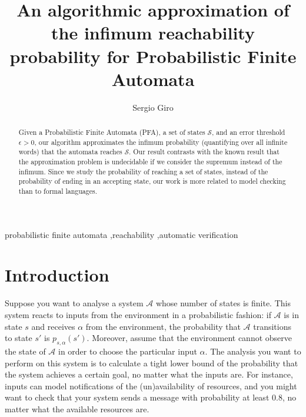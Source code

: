 \documentclass[final,3p,times,twocolumn]{elsarticle}
\theoremstyle{plain}
\theoremstyle{definition}
\newcommand{\reachset}{\mathcal{S}}
\newcommand{\errthres}{\epsilon}
\newcommand{\sys}{\mathcal{A}}
\newcommand{\prob}[3]{p_{{#1},{#2}}(#3)}
\begin{document}
\begin{frontmatter}



\title{An algorithmic approximation of the infimum reachability
			probability for Probabilistic Finite Automata}\author{Sergio Giro}\address{FaMAF -- Universidad Nacional de C\'ordoba -- Argentina\\
			FCEIA -- Universidad Nacional de Rosario}













\begin{abstract}
Given a Probabilistic Finite Automata (PFA), a set of states $\reachset$,
and an error threshold $\errthres > 0$, our algorithm approximates the
infimum probability (quantifying over all infinite words) that the automata
reaches $\reachset$. Our result contrasts with the known result that the
approximation problem is undecidable if we consider the supremum instead of the
infimum. Since we study the probability of reaching a set of states, instead of
the probability of ending in an accepting state, our work is more related to
model checking than to formal languages.
\end{abstract}

\begin{keyword}
probabilistic finite automata \sep reachability \sep automatic verification
\end{keyword}

\end{frontmatter}



\section{Introduction}
\label{}

Suppose you want to analyse a system $\sys$ whose number of states is finite.
This system reacts to inputs from the environment in
a probabilistic fashion: if $\sys$ is in state $s$ and receives
$\alpha$ from the environment, the probability that $\sys$ transitions
to state $s'$ is $\prob{s}{\alpha}{s'}$. Moreover, assume that the environment
cannot observe the state of $\sys$ in order to choose the particular input
$\alpha$. The analysis you want to perform on this system is to calculate a
tight lower bound of the probability that the system achieves a certain goal,
no matter what the inputs are. For instance, inputs can model notifications
of the (un)availability of resources, and you might want to check that your
system sends a message with probability at least $0.8$, no matter what the
available resources are.
\end{document}
